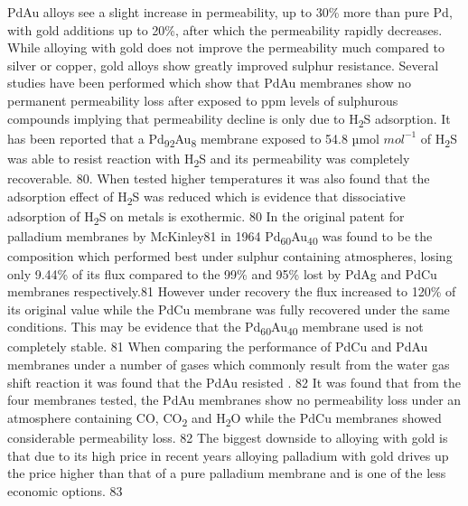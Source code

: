 PdAu alloys see a slight increase in permeability,  up to 30\% more than pure Pd, with gold 
additions up to 20\%, after which the permeability rapidly decreases. While alloying with 
gold does not improve the permeability much compared to silver or copper, gold alloys show 
greatly improved sulphur resistance. Several studies have been performed which show that PdAu 
membranes show no permanent permeability loss after exposed to ppm levels of sulphurous 
compounds implying that permeability decline is only due to H\textsubscript{2}S adsorption. 
It has been reported that a Pd\textsubscript{92}Au\textsubscript{8} membrane exposed to 
54.8 µmol $mol^{-1}$ of H\textsubscript{2}S was able to resist reaction with H\textsubscript{2}S and its permeability was 
completely recoverable. 80. When tested higher temperatures it was also found that the 
adsorption effect of H\textsubscript{2}S was reduced which is evidence that dissociative adsorption of H\textsubscript{2}S 
on metals is exothermic. 80 In the original patent for palladium membranes by  McKinley81 
in 1964 Pd\textsubscript{60}Au\textsubscript{40} was found to be the composition which performed best under sulphur 
containing atmospheres, losing only 9.44\% of its flux compared to the 99\% and 95\% lost by 
PdAg and PdCu membranes respectively.81 However under recovery the flux increased to 120\% 
of its original value while the PdCu membrane was fully recovered under the same conditions. 
This may be evidence that the Pd\textsubscript{60}Au\textsubscript{40} membrane used is not completely stable. 81 When 
comparing the performance of PdCu and PdAu membranes under a number of gases which commonly 
result from the water gas shift reaction it was found that the PdAu resisted . 82 
It was found that from the four membranes tested, the PdAu membranes show no permeability 
loss under an atmosphere containing CO, CO\textsubscript{2} and H\textsubscript{2}O while the PdCu membranes showed 
considerable permeability loss. 82 The biggest downside to alloying with gold is that 
due to its high price in recent years alloying palladium with gold drives up the price 
higher than that of a pure palladium membrane and is one of the less economic options. 83

